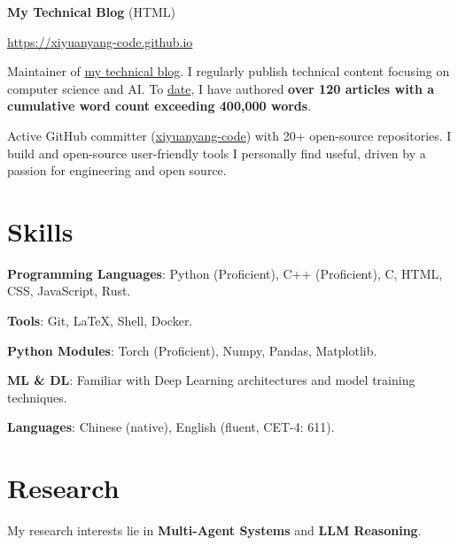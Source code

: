 \documentclass[letterpaper,11pt]{article}
\begin{document}
\textbf{My Technical Blog} (HTML)

\url{https://xiyuanyang-code.github.io} 

Maintainer of \href{https://xiyuanyang-code.github.io}{my technical blog}. I regularly publish technical content focusing on computer science and AI. To \href{https://xiyuanyang-code.github.io/Blog-word-counting/}{date}, I have authored \textbf{over 120 articles with a cumulative word count exceeding 400,000 words}.
\newline

Active GitHub committer (\href{https://github.com/xiyuanyang-code}{xiyuanyang-code}) with 20+ open-source repositories. I build and open-source user-friendly tools I personally find useful, driven by a passion for engineering and open source.

\section{Skills}
\textbf{Programming Languages}: Python (Proficient), C++ (Proficient), C, HTML, CSS, JavaScript, Rust.

\textbf{Tools}: Git, LaTeX, Shell, Docker.

\textbf{Python Modules}: Torch (Proficient), Numpy, Pandas, Matplotlib.

\textbf{ML \& DL}: Familiar with Deep Learning architectures and model training techniques.

\textbf{Languages}: Chinese (native), English (fluent, CET-4: 611).


\section{Research}

My research interests lie in \textbf{Multi-Agent Systems} and \textbf{LLM Reasoning}. 




\end{document}
